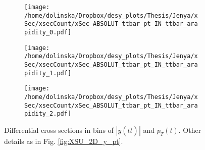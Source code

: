 \begin{figure}[p]
\centering
\begin{subfigure}
  \centering
  \texttt{[image: /home/dolinska/Dropbox/desy\_plots/Thesis/Jenya/xSec/xsecCount/xSec\_ABSOLUT\_ttbar\_pt\_IN\_ttbar\_arapidity\_0.pdf]}
\end{subfigure}
\begin{subfigure}
  \centering
  \texttt{[image: /home/dolinska/Dropbox/desy\_plots/Thesis/Jenya/xSec/xsecCount/xSec\_ABSOLUT\_ttbar\_pt\_IN\_ttbar\_arapidity\_1.pdf]}
\end{subfigure}
\begin{subfigure}
  \centering
  \texttt{[image: /home/dolinska/Dropbox/desy\_plots/Thesis/Jenya/xSec/xsecCount/xSec\_ABSOLUT\_ttbar\_pt\_IN\_ttbar\_arapidity\_2.pdf]}
\end{subfigure}
\caption{Differential cross sections in bins of $|y(t\bar{t})|$ and $p_{T}(t)$. Other details as in Fig. \ref{fig:XSU_2D_y_pt}.}
\label{fig:XSU_2D_pttt_ytt}
\end{figure}

